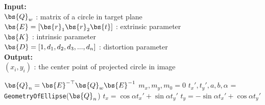 \begin{algorithm}[h]
    \footnotesize
    \caption{Unbiased estimator}
    \label{alg:unbiased}
    \hspace*{\algorithmicindent} \textbf{Input:} \\%
	\hspace*{\algorithmicindent}\hspace{1em} $\bs{Q}_w$ : matrix of a circle in target plane\\
	\hspace*{\algorithmicindent}\hspace{1em} $\bs{E} = [\bs{r}_1 \bs{r}_2 \bs{t}]$ : extrinsic parameter\\
	\hspace*{\algorithmicindent}\hspace{1em} $\bs{K}$ : intrinsic parameter\\
        \hspace*{\algorithmicindent}\hspace{1em} $\bs{D}=[1, d_1, d_2, d_3, ... ,d_n]$ : distortion parameter\\
	\hspace*{\algorithmicindent} \textbf{Output:} \\
        \hspace*{\algorithmicindent}\hspace{1em} $(x_i, y_i)$ : the center point of projected circle in image
    \begin{algorithmic}[1]
    \State $\bs{Q}_n = \bs{E}^{-\top}\bs{Q}_w\bs{E}^{-1}$
    \State $m_x, m_y, m_0=0$
        \State $t_x', t_y', a, b, \alpha$ = \texttt{GeometryOfEllipse}($\bs{Q}_n$)\quad{}
        \State $t_x = \cos\alpha t_x' + \sin\alpha t_y'$ 
        \State $t_y = -\sin\alpha t_x' + \cos\alpha t_y'$ 

\end{algorithmic}
\end{algorithm}
